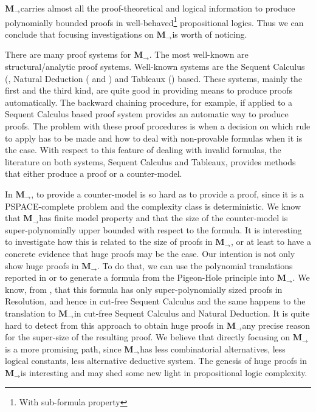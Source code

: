 \documentclass[11pt]{llncs}
\newcommand{\mil}{\ensuremath{\mathbf{M}_{\rightarrow}}}
\begin{document}
\mil carries almost all the proof-theoretical and logical information to produce polynomially bounded proofs in well-behaved\footnote{With sub-formula property} propositional logics. Thus we can conclude that focusing investigations on \mil is worth of noticing. 

There are many proof systems for \mil. The most well-known are structural/analytic  proof systems. Well-known systems are the Sequent Calculus (\cite{Gentzen}, Natural Deduction (\cite{Gentzen} and \cite{Prawitz}) and Tableaux (\cite{Beth,Smullyan}) based. These systems, mainly the first and the third kind, are quite good in providing means to produce proofs automatically. The backward chaining procedure, for example, if applied to a Sequent Calculus based proof system provides an automatic way to produce proofs. The problem with these proof procedures is when a decision on which rule to apply has to be made and how to deal with non-provable formulas when it is the case. With respect to this feature of dealing with invalid formulas, the  literature on both systems, Sequent Calculus and Tableaux, provides methods that either produce a proof or a counter-model. 

In \mil,  to provide a counter-model is so hard as to provide a proof, since it is a PSPACE-complete problem and the complexity class is deterministic. We know that \mil has finite model property and that the size of the counter-model is super-polynomially  upper bounded with respect to  the formula. It is interesting to investigate how this is related to the size of proofs in \mil, or at least to have a concrete evidence that huge proofs may be the case. Our intention is not only show huge proofs in \mil. To do that, we can use the polynomial translations reported in \cite{Statman} or \cite{Haeusler} to generate a formula from the Pigeon-Hole principle into \mil. We know, from \cite{Haken}, that this formula has only super-polynomially sized proofs in Resolution, and hence in cut-free Sequent Calculus and the same happens to the translation to \mil in cut-free Sequent Calculus and Natural Deduction. It is quite hard to detect from this approach to obtain huge proofs in \mil any precise reason for the super-size of the resulting proof. We believe that directly focusing on \mil is a more promising path, since \mil has less combinatorial alternatives, less logical constants, less alternative deductive system. The genesis of huge proofs in \mil is interesting and may shed some new light in propositional logic complexity. 
\end{document}
